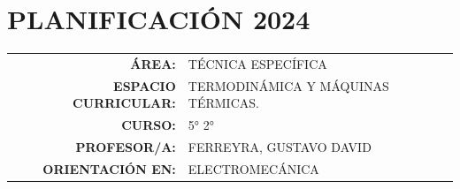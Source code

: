 \documentclass[a4paper]{article}
\newcommand{\ano}{2024} %
\begin{document}
\section*{\centering PLANIFICACIÓN \ano}

\begin{tabular}{r l}
     
\textbf{ÁREA:}&TÉCNICA ESPECÍFICA \\

\textbf{ESPACIO CURRICULAR:} &TERMODINÁMICA Y MÁQUINAS TÉRMICAS. \\

\textbf{CURSO:}&5° 2°\\

\textbf{PROFESOR/A:}& FERREYRA, GUSTAVO DAVID\\

\textbf{ORIENTACIÓN EN:} & ELECTROMECÁNICA  \\
     
\end{tabular}
\end{document}
